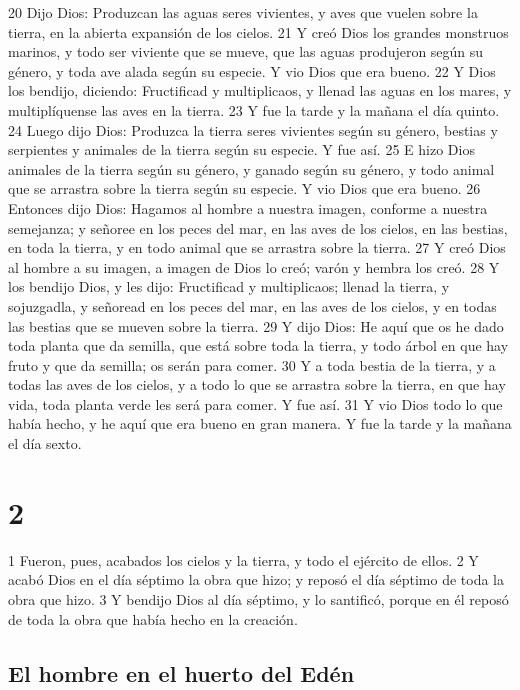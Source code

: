 20 Dijo Dios: Produzcan las aguas seres vivientes, y aves que vuelen sobre la tierra, en la abierta expansión de los cielos.
21 Y creó Dios los grandes monstruos marinos, y todo ser viviente que se mueve, que las aguas produjeron según su género, y toda ave alada según su especie. Y vio Dios que era bueno.
22 Y Dios los bendijo, diciendo: Fructificad y multiplicaos, y llenad las aguas en los mares, y multiplíquense las aves en la tierra.
23 Y fue la tarde y la mañana el día quinto.
24 Luego dijo Dios: Produzca la tierra seres vivientes según su género, bestias y serpientes y animales de la tierra según su especie. Y fue así.
25 E hizo Dios animales de la tierra según su género, y ganado según su género, y todo animal que se arrastra sobre la tierra según su especie. Y vio Dios que era bueno.
26 Entonces dijo Dios: Hagamos al hombre a nuestra imagen, conforme a nuestra semejanza; y señoree en los peces del mar, en las aves de los cielos, en las bestias, en toda la tierra, y en todo animal que se arrastra sobre la tierra.
27 Y creó Dios al hombre a su imagen, a imagen de Dios lo creó; varón y hembra los creó.
28 Y los bendijo Dios, y les dijo: Fructificad y multiplicaos; llenad la tierra, y sojuzgadla, y señoread en los peces del mar, en las aves de los cielos, y en todas las bestias que se mueven sobre la tierra.
29 Y dijo Dios: He aquí que os he dado toda planta que da semilla, que está sobre toda la tierra, y todo árbol en que hay fruto y que da semilla; os serán para comer.
30 Y a toda bestia de la tierra, y a todas las aves de los cielos, y a todo lo que se arrastra sobre la tierra, en que hay vida, toda planta verde les será para comer. Y fue así.
31 Y vio Dios todo lo que había hecho, y he aquí que era bueno en gran manera. Y fue la tarde y la mañana el día sexto.

\chapter{2}

1 Fueron, pues, acabados los cielos y la tierra, y todo el ejército de ellos.
2 Y acabó Dios en el día séptimo la obra que hizo; y reposó el día séptimo de toda la obra que hizo.
3 Y bendijo Dios al día séptimo, y lo santificó, porque en él reposó de toda la obra que había hecho en la creación.

\section{El hombre en el huerto del Edén}

